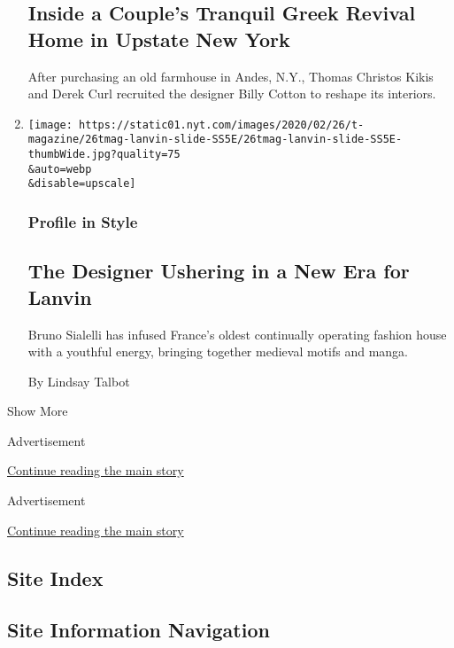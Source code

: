 \begin{enumerate}
  \hypertarget{inside-a-couples-tranquil-greek-revival-home-in-upstate-new-york}{%
  \subsection{Inside a Couple's Tranquil Greek Revival Home in Upstate
  New
  York}\label{inside-a-couples-tranquil-greek-revival-home-in-upstate-new-york}}

  After purchasing an old farmhouse in Andes, N.Y., Thomas Christos
  Kikis and Derek Curl recruited the designer Billy Cotton to reshape
  its interiors.
\item
  \href{/2020/02/26/t-magazine/bruno-sialelli-lanvin.html}{}

  \texttt{[image: https://static01.nyt.com/images/2020/02/26/t-magazine/26tmag-lanvin-slide-SS5E/26tmag-lanvin-slide-SS5E-thumbWide.jpg?quality=75\\\&auto=webp\\\&disable=upscale]}

  \hypertarget{profile-in-style}{%
  \subsubsection{Profile in Style}\label{profile-in-style}}

  \hypertarget{the-designer-ushering-in-a-new-era-for-lanvin}{%
  \subsection{The Designer Ushering in a New Era for
  Lanvin}\label{the-designer-ushering-in-a-new-era-for-lanvin}}

  Bruno Sialelli has infused France's oldest continually operating
  fashion house with a youthful energy, bringing together medieval
  motifs and manga.

  By Lindsay Talbot
\end{enumerate}

Show More

Advertisement

\protect\hyperlink{after-mid2}{Continue reading the main story}

Advertisement

\protect\hyperlink{after-mktg}{Continue reading the main story}

\hypertarget{site-index}{%
\subsection{Site Index}\label{site-index}}

\hypertarget{site-information-navigation}{%
\subsection{Site Information
Navigation}\label{site-information-navigation}}

